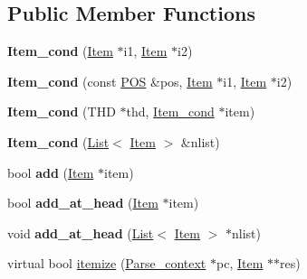 \subsection*{Public Member Functions}
\begin{DoxyCompactItemize}
\item 
\mbox{\label{classItem__cond_a27139e1afe1672bb97f6c9d08491c2ab}} 
{\bfseries Item\+\_\+cond} (\mbox{\hyperlink{classItem}{Item}} $\ast$i1, \mbox{\hyperlink{classItem}{Item}} $\ast$i2)
\item 
\mbox{\label{classItem__cond_a95b5095565daa550ce98176379e269f9}} 
{\bfseries Item\+\_\+cond} (const \mbox{\hyperlink{structYYLTYPE}{P\+OS}} \&pos, \mbox{\hyperlink{classItem}{Item}} $\ast$i1, \mbox{\hyperlink{classItem}{Item}} $\ast$i2)
\item 
\mbox{\label{classItem__cond_a5e963c483eb6e6f5871beb6c5e298ab2}} 
{\bfseries Item\+\_\+cond} (T\+HD $\ast$thd, \mbox{\hyperlink{classItem__cond}{Item\+\_\+cond}} $\ast$item)
\item 
\mbox{\label{classItem__cond_a96e476dbf47d4104e804aebfd4138325}} 
{\bfseries Item\+\_\+cond} (\mbox{\hyperlink{classList}{List}}$<$ \mbox{\hyperlink{classItem}{Item}} $>$ \&nlist)
\item 
\mbox{\label{classItem__cond_ad8d722f0200a292c4fab3a7b617ed852}} 
bool {\bfseries add} (\mbox{\hyperlink{classItem}{Item}} $\ast$item)
\item 
\mbox{\label{classItem__cond_a15621ee2daa7bfa98245e73d24f17f28}} 
bool {\bfseries add\+\_\+at\+\_\+head} (\mbox{\hyperlink{classItem}{Item}} $\ast$item)
\item 
\mbox{\label{classItem__cond_a135f333d8fcbb021925a5dacdf38828b}} 
void {\bfseries add\+\_\+at\+\_\+head} (\mbox{\hyperlink{classList}{List}}$<$ \mbox{\hyperlink{classItem}{Item}} $>$ $\ast$nlist)
\item 
virtual bool \mbox{\hyperlink{classItem__cond_a188060057f9f212bd0946f952b276555}{itemize}} (\mbox{\hyperlink{structParse__context}{Parse\+\_\+context}} $\ast$pc, \mbox{\hyperlink{classItem}{Item}} $\ast$$\ast$res)
\item 
$$
\end{DoxyCompactItemize}
